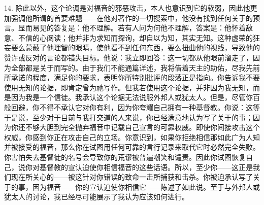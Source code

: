 14. 除此以外，这个论调是对福音的邪恶攻击，本人也意识到它的软弱，因此他更加强调他所谓的首要难题——在他对著作的一切搜索中，他没有找到任何关于的预言。显而易见的答复是：他不理解。若有人问为何他不理解，答案是：他怀着敌意、不信的心阅读；他并非为求知而探询，却自以为知，其实无知。这种虚荣的狂妄要么蒙蔽了他理智的眼睛，使他看不到任何东西，要么扭曲他的视线，导致他的赞许或反对的言论都错失目标。他说：我立即回答：这一切都从他眼前溜走了，因为全部都是关于而写的。由于我们不能通篇详述，我将借着天主的助佑，尽我先前所承诺的程度，满足你的要求，表明你所特别批评的段落正是指向。你告诉我不要使用无知的论据，即肯定曾为祂写作。但我若使用这个论据，并非因为我无知，而是因为我是一个信徒。我承认这个论据无法说服外邦人或犹太人。但是，尽管你百般回避，你不得不承认它对你有利，因为你夸耀自己拥有一种基督教。你说：这等于是说，至少对于目前与我打交道的人来说，你已经满意地认为写了关于的事；因为你还不够大胆到完全抛弃福音中记载自己宣言的可靠权威。即使你间接攻击这个权威，你感到你正在攻击自己的立场。你意识到，如果你拒绝相信那如此广为人知并被接受的福音，那么你在试图用任何可靠的言行记录来取代它时必然完全失败。你害怕失去基督徒的名号会导致你的荒谬被普遍嘲笑和谴责。因此你试图恢复自己，说你对基督教的宣认迫使你相信福音的这些话语。所以，至少你——这正是我们现在所关心的——被这针对你错误的致命一击所捕获和击杀。你被迫承认写了关于的事，因为福音——你的宣认迫使你相信它——陈述了如此说。至于与外邦人或犹太人的讨论，我已经尽可能展示了我认为应该如何进行。\par

